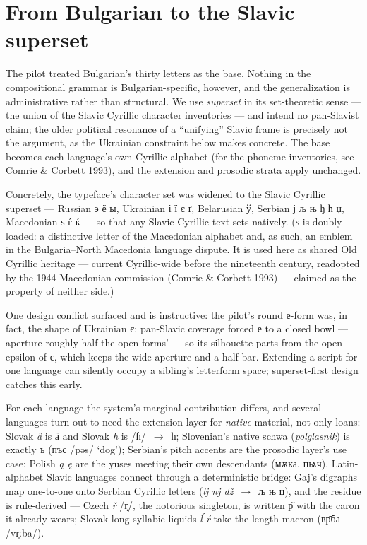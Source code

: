 \documentclass[12pt]{article}
\newcommand{\cz}[1]{{\chu #1}}
\newcommand{\ph}[1]{{\ipafont/#1/}}
\begin{document}
\section{From Bulgarian to the Slavic superset}
\label{sec:panslavic}

The pilot treated Bulgarian's thirty letters as the base. Nothing in the compositional grammar is Bulgarian-specific, however, and the generalization is administrative rather than structural. We use \emph{superset} in its set-theoretic sense — the union of the Slavic Cyrillic character inventories — and intend no pan-Slavist claim; the older political resonance of a ``unifying'' Slavic frame is precisely not the argument, as the Ukrainian constraint below makes concrete. The base becomes each language's own Cyrillic alphabet (for the phoneme inventories, see Comrie \& Corbett 1993), and the extension and prosodic strata apply unchanged.

Concretely, the typeface's character set was widened to the Slavic Cyrillic superset — Russian \cz{э ё ы}, Ukrainian \cz{і ї є ґ}, Belarusian \cz{ў}, Serbian \cz{ј љ њ ђ ћ џ}, Macedonian \cz{ѕ ѓ ќ} — so that any Slavic Cyrillic text sets natively. (\cz{ѕ} is doubly loaded: a distinctive letter of the Macedonian alphabet and, as such, an emblem in the Bulgaria–North Macedonia language dispute. It is used here as shared Old Cyrillic heritage — current Cyrillic-wide before the nineteenth century, readopted by the 1944 Macedonian commission (Comrie \& Corbett 1993) — claimed as the property of neither side.)

One design conflict surfaced and is instructive: the pilot's round е-form was, in fact, the shape of Ukrainian \cz{є}; pan-Slavic coverage forced \cz{е} to a closed bowl — aperture roughly half the open forms' — so its silhouette parts from the open epsilon of \cz{є}, which keeps the wide aperture and a half-bar. Extending a script for one language can silently occupy a sibling's letterform space; superset-first design catches this early.

For each language the system's marginal contribution differs, and several languages turn out to need the extension layer for \emph{native} material, not only loans: Slovak \emph{ä} is \cz{ӓ} and Slovak \emph{h} is \ph{ɦ}~$\rightarrow$~\cz{һ}; Slovenian's native schwa (\emph{polglasnik}) is exactly \cz{ъ} (\cz{пъс} \ph{pəs} `dog'); Serbian's pitch accents are the prosodic layer's use case; Polish \emph{ą ę} are the yuses meeting their own descendants (\cz{мѫка}, \cz{пѩч}). Latin-alphabet Slavic languages connect through a deterministic bridge: Gaj's digraphs map one-to-one onto Serbian Cyrillic letters (\emph{lj nj dž}~$\rightarrow$~\cz{љ њ џ}), and the residue is rule-derived — Czech \emph{ř} \ph{r̝}, the notorious singleton, is written \cz{р̌} with the caron it already wears; Slovak long syllabic liquids \emph{ĺ ŕ} take the length macron (\cz{вр̄ба} \ph{vr̩ːba}).
\end{document}
